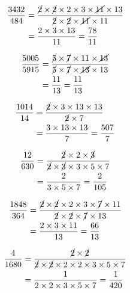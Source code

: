 {{\item\begin{align*}
    \dfrac{3432}{484} &=
    \dfrac{\cancel{2} \times \cancel{2} \times 2 \times 3 \times \cancel{11} \times 13}
    {\cancel{2} \times \cancel{2} \times \cancel{11} \times 11}\\ &=
    \dfrac{2 \times 3 \times 13}
    {11} =
    \dfrac{78}{11}
    \end{align*}

\item\begin{align*}
    \dfrac{5005}{5915} &=
    \dfrac{\cancel{5} \times \cancel{7} \times 11 \times \cancel{13}}
    {\cancel{5} \times \cancel{7} \times \cancel{13} \times 13}\\ &=
    \dfrac{11}
    {13} =
    \dfrac{11}{13}
    \end{align*}

\item\begin{align*}
    \dfrac{1014}{14} &=
    \dfrac{\cancel{2} \times 3 \times 13 \times 13}
    {\cancel{2} \times 7}\\ &=
    \dfrac{3 \times 13 \times 13}
    {7} =
    \dfrac{507}{7}
    \end{align*}

\item\begin{align*}
    \dfrac{12}{630} &=
    \dfrac{\cancel{2} \times 2 \times \cancel{3}}
    {\cancel{2} \times \cancel{3} \times 3 \times 5 \times 7}\\ &=
    \dfrac{2}
    {3 \times 5 \times 7} =
    \dfrac{2}{105}
    \end{align*}

\item\begin{align*}
    \dfrac{1848}{364} &=
    \dfrac{\cancel{2} \times \cancel{2} \times 2 \times 3 \times \cancel{7} \times 11}
    {\cancel{2} \times \cancel{2} \times \cancel{7} \times 13}\\ &=
    \dfrac{2 \times 3 \times 11}
    {13} =
    \dfrac{66}{13}
    \end{align*}

\item\begin{align*}
    \dfrac{4}{1680} &=
    \dfrac{\cancel{2} \times \cancel{2}}
    {\cancel{2} \times \cancel{2} \times 2 \times 2 \times 3 \times 5 \times 7}\\ &=
    \dfrac{1}
    {2 \times 2 \times 3 \times 5 \times 7} =
    \dfrac{1}{420}
    \end{align*}

}}
